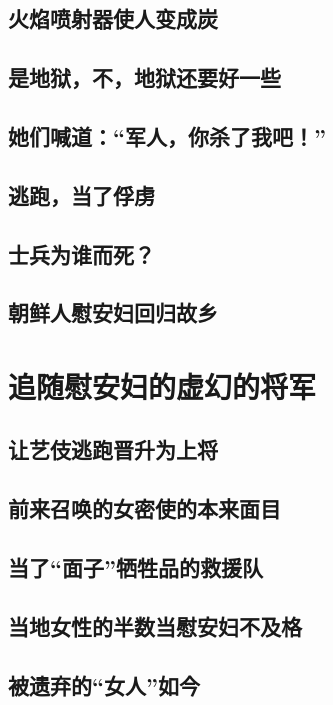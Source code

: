 \documentclass[12pt,UTF8]{ctexbook}
\begin{document}
\section{火焰喷射器使人变成炭}

\section{是地狱，不，地狱还要好一些}

\section{她们喊道：“军人，你杀了我吧！”}

\section{逃跑，当了俘虏}

\section{士兵为谁而死？}

\section{朝鲜人慰安妇回归故乡}

\chapter{追随慰安妇的虚幻的将军}

\section{让艺伎逃跑晋升为上将}

\section{前来召唤的女密使的本来面目}

\section{当了“面子”牺牲品的救援队}

\section{当地女性的半数当慰安妇不及格}

\section{被遗弃的“女人”如今}
\end{document}

